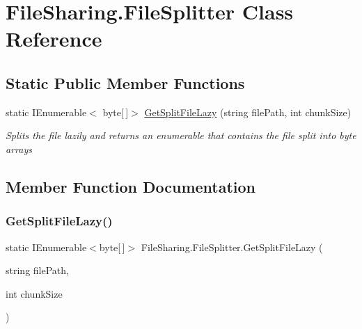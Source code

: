 \hypertarget{class_file_sharing_1_1_file_splitter}{}\section{File\+Sharing.\+File\+Splitter Class Reference}
\label{class_file_sharing_1_1_file_splitter}
\subsection*{Static Public Member Functions}
\begin{DoxyCompactItemize}
\item 
static I\+Enumerable$<$ byte\mbox{[}$\,$\mbox{]}$>$ \hyperlink{class_file_sharing_1_1_file_splitter_abc052a1ac224ba327a6380ee0d108f98}{Get\+Split\+File\+Lazy} (string file\+Path, int chunk\+Size)
\begin{DoxyCompactList}\small\item\em Splits the file lazily and returns an enumerable that contains the file split into byte arrays \end{DoxyCompactList}\end{DoxyCompactItemize}


\subsection{Member Function Documentation}
\mbox{\label{class_file_sharing_1_1_file_splitter_abc052a1ac224ba327a6380ee0d108f98}} 
\subsubsection{\texorpdfstring{Get\+Split\+File\+Lazy()}{GetSplitFileLazy()}}
{\footnotesize\ttfamily static I\+Enumerable$<$byte\mbox{[}$\,$\mbox{]}$>$ File\+Sharing.\+File\+Splitter.\+Get\+Split\+File\+Lazy (\begin{DoxyParamCaption}\item[{string}]{file\+Path,  }\item[{int}]{chunk\+Size }\end{DoxyParamCaption})\hspace{0.3cm}{\ttfamily [static]}}



